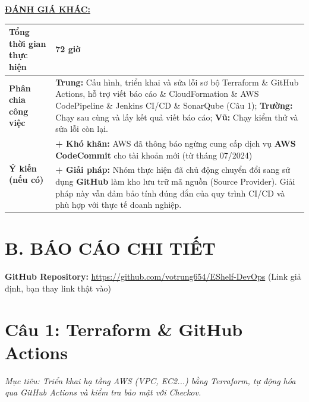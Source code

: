 \documentclass[12pt,a4paper]{article}
\begin{document}
\vspace{1cm}
\begin{flushleft}
\textbf{\underline{ĐÁNH GIÁ KHÁC:}}
\begin{table}[H]
    \begin{tabular}{|p{5cm}|p{10cm}|}
        \hline
        \textbf{Tổng thời gian thực hiện} & 72 giờ \\ \hline
        \textbf{Phân chia công việc} & \textbf{Trung:} Cấu hình, triển khai và sửa lỗi sơ bộ Terraform \& GitHub Actions, hỗ trợ viết báo cáo \& CloudFormation \& AWS CodePipeline \&  Jenkins CI/CD \& SonarQube  (Câu 1); \textbf{Trường:} Chạy sau cùng và lấy kết quả viết báo cáo; \textbf{Vũ:} Chạy kiểm thử và sửa lỗi còn lại. \\ \hline
        \multirow{4}{*}{\textbf{Ý kiến (nếu có)}} & \textbf{+ Khó khăn:} AWS đã thông báo ngừng cung cấp dịch vụ \textbf{AWS CodeCommit} cho tài khoản mới (từ tháng 07/2024) \\ \cline{2-2}
         & \textbf{+ Giải pháp:} Nhóm thực hiện đã chủ động chuyển đổi sang sử dụng \textbf{GitHub} làm kho lưu trữ mã nguồn (Source Provider). Giải pháp này vẫn đảm bảo tính đúng đắn của quy trình CI/CD và phù hợp với thực tế doanh nghiệp.  \\ \hline
    \end{tabular}
\end{table}
\end{flushleft}

\newpage

\section*{B. BÁO CÁO CHI TIẾT} 

\noindent
\textbf{GitHub Repository:} \href{https://github.com/votrung654/EShelf-DevOps}{https://github.com/votrung654/EShelf-DevOps} (Link giả định, bạn thay link thật vào)

\section*{Câu 1: Terraform \& GitHub Actions}
\textit{Mục tiêu: Triển khai hạ tầng AWS (VPC, EC2...) bằng Terraform, tự động hóa qua GitHub Actions và kiểm tra bảo mật với Checkov.}
\end{document}
